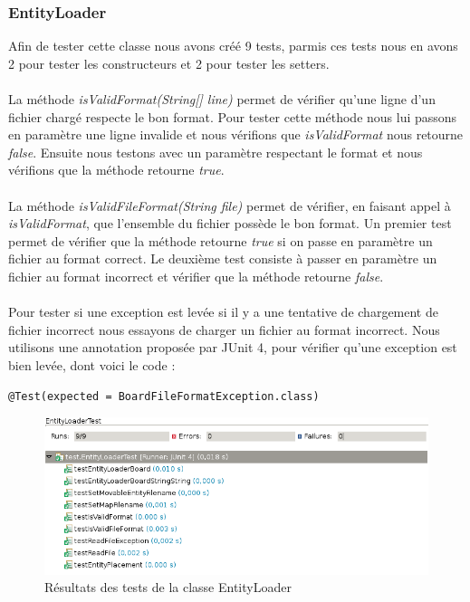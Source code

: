 			\subsubsection{EntityLoader}
				
				Afin de tester cette classe nous avons créé 9 tests, parmis ces tests nous en avons 2 pour tester les constructeurs et 2 pour tester les setters.\\ \\
				La méthode {\itshape isValidFormat(String[] line)} permet de vérifier qu'une ligne d'un fichier chargé respecte le bon format.
				Pour tester cette méthode nous lui passons en paramètre une ligne invalide et nous vérifions que {\itshape isValidFormat} nous retourne {\itshape false}.
				Ensuite nous testons avec un paramètre respectant le format et nous vérifions que la méthode retourne {\itshape true}.\\ \\

				La méthode {\itshape isValidFileFormat(String file)} permet de vérifier, en faisant appel à {\itshape isValidFormat}, que l'ensemble du fichier possède le bon format.
				Un premier test permet de vérifier que la méthode retourne {\itshape true} si on passe en paramètre un fichier au format correct.
				Le deuxième test consiste à passer en paramètre un fichier au format incorrect et vérifier que la méthode retourne {\itshape false}.\\ \\

				Pour tester si une exception est levée si il y a une tentative de chargement de fichier incorrect nous essayons de charger un fichier au format incorrect.
				Nous utilisons une annotation proposée par JUnit 4, pour vérifier qu'une exception est bien levée, dont voici le code : 
				
				\begin{lstlisting}[frame=single]
@Test(expected = BoardFileFormatException.class)
				\end{lstlisting}

				\begin{figure}[!h]
				    \caption{Résultats des tests de la classe EntityLoader}
				    \centerline{\includegraphics[scale=0.7]{images/tests_unitaires/entityloader.png}}
				\end{figure}


